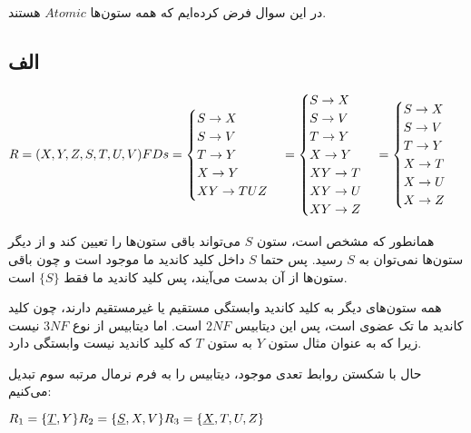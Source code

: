 در این سوال فرض کرده‌ایم که همه ستون‌ها 
$Atomic$
هستند.

\subsection*{الف}

\setLTR
$
R = (X,Y,Z,S,T,U,V) \\
FDs=\begin{cases}
	S\rightarrow X\\
	S\rightarrow V \\
	T \rightarrow Y \\
	X \rightarrow Y \\
	XY \rightarrow TUZ
	\end{cases} = \begin{cases}
	S\rightarrow X\\
	S\rightarrow V \\
	T \rightarrow Y \\
	X \rightarrow Y \\
	XY \rightarrow T \\
	XY \rightarrow U \\
	XY \rightarrow Z
	\end{cases} = \begin{cases}
	S\rightarrow X\\
	S\rightarrow V \\
	T \rightarrow Y \\
	X \rightarrow T \\
	X \rightarrow U \\
	X \rightarrow Z
	\end{cases}
$
\setRTL

همانطور که مشخص است، ‌ستون $S$ می‌تواند باقی ستون‌ها را تعیین کند و از دیگر ستون‌ها نمی‌توان به $S$ رسید. پس حتما $S$ داخل کلید کاندید ما موجود است و چون باقی ستون‌ها از آن بدست می‌آیند، پس کلید کاندید ما فقط $\{S\}$ است.

همه ستون‌‌های دیگر به کلید کاندید وابستگی مستقیم یا غیرمستقیم دارند، چون کلید کاندید ما تک عضوی است، پس این دیتابیس 
$2NF$
است. اما دیتابیس از نوع $3NF$ نیست زیرا که به عنوان مثال ستون $Y$ به ستون $T$ که کلید کاندید نیست وابستگی دارد.

حال با شکستن روابط تعدی موجود، دیتابیس را به فرم نرمال مرتبه سوم تبدیل می‌کنیم:

\setLTR
$
R_1 = \{\underline{T},Y\} \\ \\
R_2 = \{\underline{S},X,V\} \\ \\
R_3 = \{\underline{X},T,U,Z\}
$
\setRTL

